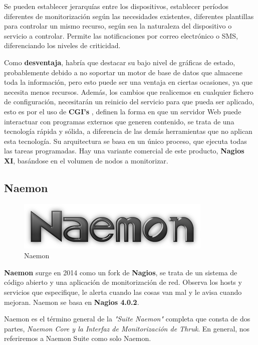 Se pueden establecer jerarquías entre los dispositivos, establecer períodos diferentes de monitorización según las necesidades existentes, diferentes plantillas para controlar un mismo recurso, según sea la naturaleza del dispositivo o servicio a controlar.
Permite las notificaciones por correo electrónico o SMS, diferenciando los niveles de criticidad.

Como \textbf{desventaja}, habría que destacar su bajo nivel de gráficas de estado, probablemente debido a no soportar un motor de base de datos que almacene toda la información, pero esto puede ser una ventaja en ciertas ocasiones, ya que necesita menos recursos. Además, los cambios que realicemos en cualquier fichero de configuración, necesitarán un reinicio del servicio para que pueda ser aplicado, esto es por el uso de \textbf{CGI's }\cite{cgi}, definen la forma en que un servidor Web puede interactuar con
programas externos que generen contenido, se trata de una tecnología rápida y sólida, a diferencia de las demás herramientas que no aplican esta tecnología. Su arquitectura se basa en un único proceso, que ejecuta todas las tareas programadas.
\newpage
Hay una variante comercial de este producto, \textbf{Nagios XI}, basándose en el volumen de nodos a monitorizar.
\subsection{Naemon}
\begin{figure}[H]
	\centering
	\includegraphics[scale=0.4]{imagenes/logos_monitorizacion/naemon.png}
	\caption{Naemon} \label{naemon}
	
\end{figure}
\textbf{Naemon} \cite{naemon} surge en 2014 como un fork de \textbf{Nagios}, se trata de un sistema de código abierto y una aplicación de monitorización de red. Observa los hosts y servicios que especifique, le alerta cuando las cosas van mal y le avisa cuando mejoran. Naemon se basa en \textbf{Nagios 4.0.2}.

Naemon es el término general de la \textit{"Suite Naemon"} completa que consta de dos partes, \textit{Naemon Core y la Interfaz de Monitorización de Thruk}. En general, nos referiremos a Naemon Suite como solo Naemon.

